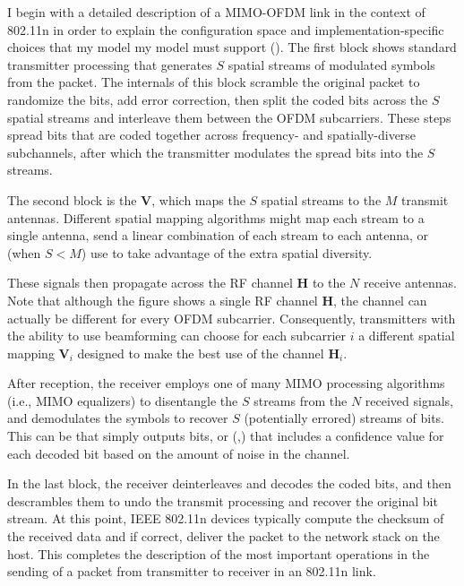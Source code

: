 I begin with a detailed description of a MIMO-OFDM link in the context of 802.11n in order to explain the configuration space and implementation-specific choices that my model my model must support (). The first block shows standard transmitter processing that generates $S$ spatial streams of modulated symbols from the packet. The internals of this block scramble the original packet to randomize the bits, add error correction, then split the coded bits across the $S$ spatial streams and interleave them between the OFDM subcarriers. These steps spread bits that are coded together across frequency- and spatially-diverse subchannels, after which the transmitter modulates the spread bits into the $S$ streams.

The second block is the  $\mathbf{V}$, which maps the $S$ spatial streams to the $M$ transmit antennas. Different spatial mapping algorithms might map each stream to a single antenna, send a linear combination of each stream to each antenna, or (when $S<M$) use  to take advantage of the extra spatial diversity.

These signals then propagate across the RF channel $\mathbf{H}$ to the $N$ receive antennas. Note that although the figure shows a single RF channel $\mathbf{H}$, the channel can actually be different for every OFDM subcarrier. Consequently, transmitters with the ability to use beamforming can choose for each subcarrier $i$ a different spatial mapping $\mathbf{V}_i$ designed to make the best use of the channel $\mathbf{H}_i$.

After reception, the receiver employs one of many MIMO processing algorithms (i.e., MIMO equalizers) to disentangle the $S$ streams from the $N$ received signals, and demodulates the symbols to recover $S$ (potentially errored) streams of bits. This can be  that simply outputs bits, or  (\cite[\S5.3.1.3]{Sklar},\cite{Jamieson_PPR}) that includes a confidence value for each decoded bit based on the amount of noise in the channel.

In the last block, the receiver deinterleaves and decodes the coded bits, and then descrambles them to undo the transmit processing and recover the original bit stream. At this point, IEEE 802.11n devices typically compute the checksum of the received data and if correct, deliver the packet to the network stack on the host. This completes the description of the most important operations in the sending of a packet from transmitter to receiver in an 802.11n link.

